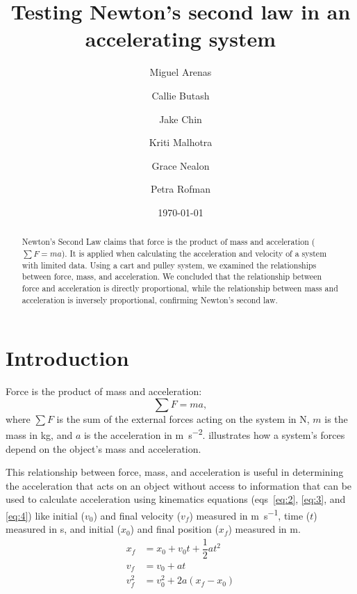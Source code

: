 ﻿\documentclass[reprint,amsmath,amssymb.aps]{revtex4-2}
\begin{document}
\title{Testing Newton's second law in an accelerating system}
\author{Miguel Arenas}
\author{Callie Butash}
\author{Jake Chin}
\author{Kriti Malhotra}
\author{Grace Nealon}
\author{Petra Rofman}
\date{\today}

\begin{abstract}
Newton’s Second Law claims that force is the product of mass and acceleration ($\sum F = ma$). It is applied when calculating the acceleration and velocity of a system with limited data. Using a cart and pulley system, we examined the relationships between force, mass, and acceleration. We concluded that the relationship between force and acceleration is directly proportional, while the relationship between mass and acceleration is inversely proportional, confirming Newton’s second law. 
\end{abstract}

\maketitle

\section{Introduction}
Force is the product of mass and acceleration:
\begin{equation}
\sum F = ma,
\label{eq:1}
\end{equation}
where $\sum F$ is the sum of the external forces acting on the system in \unit{\newton}, $m$ is the mass in \unit{\kilo\gram}, and $a$ is the acceleration in \unit{\meter\per\second\squared}.  illustrates how a system's forces depend on the object's mass and acceleration.              

This relationship between force, mass, and acceleration is useful in determining the acceleration that acts on an object without access to information that can be used to calculate acceleration using kinematics equations (eqs~\ref{eq:2}, \ref{eq:3}, and \ref{eq:4}) like initial ($v_0$) and final velocity ($v_f$) measured in \unit{\meter\per\second}, time ($t$) measured in \unit{\second}, and initial ($x_0$) and final position ($x_f$) measured in \unit{\meter}.     
\begin{align}
x_f &= x_0 + v_0 t + \dfrac{1}{2} a t^2 \label{eq:2}\\
v_f &= v_0 + a t \label{eq:3}\\
v_f^2 &= v_0^2 + 2 a (x_f - x_0) \label{eq:4}
\end{align}
\end{document}
